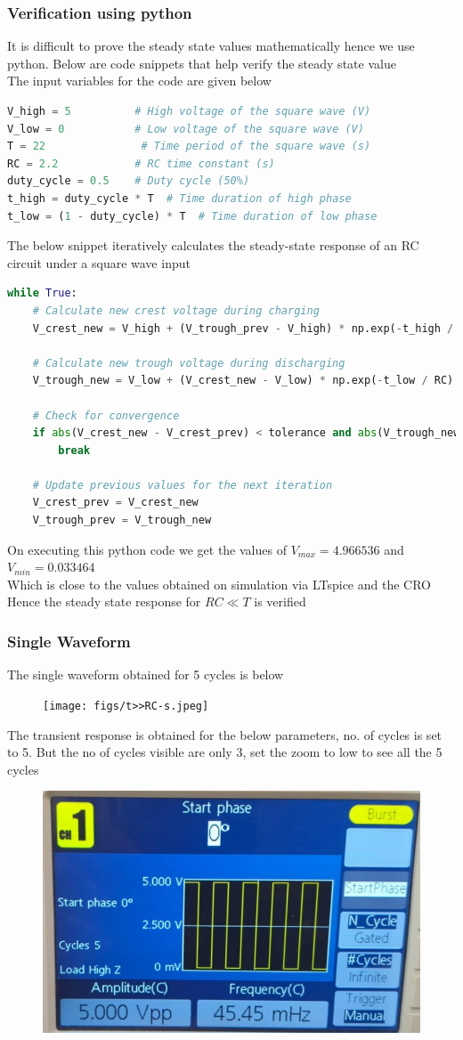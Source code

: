 \documentclass[journal]{IEEEtran}
\begin{document}
\subsubsection{Verification using python}
It is difficult to prove the steady state values mathematically hence we use python. Below are code snippets that help verify the steady state value \\
The input variables for the code are given below 
\begin{lstlisting}[language=python]
V_high = 5          # High voltage of the square wave (V)
V_low = 0           # Low voltage of the square wave (V)
T = 22               # Time period of the square wave (s)
RC = 2.2            # RC time constant (s)
duty_cycle = 0.5    # Duty cycle (50%)
t_high = duty_cycle * T  # Time duration of high phase
t_low = (1 - duty_cycle) * T  # Time duration of low phase
\end{lstlisting}
The below snippet iteratively calculates the steady-state response of an RC circuit under a square wave input
\begin{lstlisting}[language=python]
while True:
    # Calculate new crest voltage during charging
    V_crest_new = V_high + (V_trough_prev - V_high) * np.exp(-t_high / RC)
    
    # Calculate new trough voltage during discharging
    V_trough_new = V_low + (V_crest_new - V_low) * np.exp(-t_low / RC)
    
    # Check for convergence
    if abs(V_crest_new - V_crest_prev) < tolerance and abs(V_trough_new - V_trough_prev) < tolerance:
        break
    
    # Update previous values for the next iteration
    V_crest_prev = V_crest_new
    V_trough_prev = V_trough_new
\end{lstlisting}
On executing this python code we get the values of $V_{max} = 4.966536$ and $V_{min} = 0.033464$ \\
Which is close to the values obtained on simulation via LTspice and the CRO \\
Hence the steady state response for $RC\ll T$ is verified 
\subsubsection{Single Waveform}
The single waveform obtained for 5 cycles is below 
\begin{figure}[H]
    \centering
    \texttt{[image: figs/t>>RC-s.jpeg]}
\end{figure}
The transient response is obtained for the below parameters, no. of cycles is set to 5. But the no of cycles visible are only 3, set the zoom to low to see all the 5 cycles 
\begin{figure}[H]
    \centering
    \includegraphics[width=0.5\linewidth]{figs/ip2.jpeg}
\end{figure}
\end{document}
